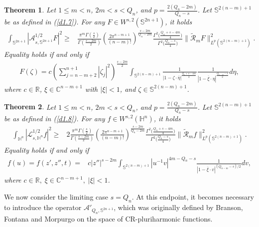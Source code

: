 \documentclass[12pt,reqno]{amsart}%
\newtheorem{theorem}{Theorem}[section]
\theoremstyle{plain}
\numberwithin{equation}{section}
\begin{document}
\begin{theorem}\label{th1.4}
Let \( 1 \leq m < n \), \( 2m < s < Q_n \), and \( p = \frac{2(Q_{n} - 2m)}{Q_{n} - s} \).
Let $\mathbb{S}^{2(n-m)+1}$ be as defined in  (\ref{d1.7}).
 For any \( F \in W^{s,2}(\mathbb{S}^{2n+1}) \), it holds
\begin{align*}
\int_{\mathbb{S}^{2n+1}}|\mathcal{A}_{s,\mathbb{S}^{2n+1}}^{1/2}F|^{2} \geq &
\frac{\pi^{m}\Gamma\left(\frac{s}{2}\right)}{\Gamma\left(\frac{s-2m}{2}\right)}
\left( \frac{2\pi^{n-m+1}}{(n-m)!} \right)^{\frac{s-2m}{Q_n-2m}}
\frac{\Gamma^{2}\bigl(\frac{Q_n + s - 4m}{4}\bigr)}{\Gamma^{2}\bigl(\frac{Q_n-s}{4}\bigr)}
\|\widetilde{\mathcal{R}}_m F\|_{L^{p}(\mathbb{S}^{2(n-m)+1})}^{2}.
\end{align*}
Equality holds if and only if
\begin{align*}
F(\zeta) = c\left(\sum_{j=n-m+2}^{n+1}|\zeta_{j}|^{2}\right)^{\frac{s-2m}{2}}\int_{\mathbb{S}^{2(n-m)+1}}
\frac{1}
{|1 - \zeta\cdot\overline{\eta}|^{\frac{Q_n + s - 4m}{2}}}
\frac{1}{|1 - \overline{\xi} \cdot \eta|^{\frac{Q_{n-m} - s}{2}}}  d\eta,
\end{align*}
where \( c \in \mathbb{R} \), \( \xi \in \mathbb{C}^{n-m+1} \) with \( |\xi| < 1 \), and \( \zeta \in \mathbb{S}^{2(n-m)+1} \).
\end{theorem}

\begin{theorem}\label{th1.5}
Let \( 1 \leq m < n \), \( 2m < s < Q_n \), and \( p = \frac{2(Q_{n} - 2m)}{Q_{n} - s} \). Let $\mathbb{S}^{2(n-m)+1}$ be  as defined in  (\ref{d1.8}). For any \( f \in W^{s,2}(\mathbb{H}^{n}) \), it holds
\begin{align*}
\int_{\mathbb{H}^{n}}|\mathcal{L}_{s,\mathbb{H}^{n}}^{1/2}f|^{2} \geq &2
\frac{\pi^{m}\Gamma\left(\frac{s}{2}\right)}{\Gamma\left(\frac{s-2m}{2}\right)}
\left( \frac{2\pi^{n-m+1}}{(n-m)!} \right)^{\frac{s-2m}{Q_n-2m}}
\frac{\Gamma^{2}\bigl(\frac{Q_n + s - 4m}{4}\bigr)}{\Gamma^{2}\bigl(\frac{Q_n-s}{4}\bigr)}
\|\widetilde{\mathcal{R}}_m f\|_{L^{p}(\mathbb{S}^{2(n-m)+1})}^{2}.
\end{align*}
Equality holds if and only if
\begin{align*}
f(u) = f(z',z'',t) = &  c|z''|^{s-2m}
\int_{\mathbb{S}^{2(n-m)+1}} |u^{-1}v|^{4m - Q_n - s}
\frac{1}{|1 - \overline{\xi} \cdot v|^{(Q_{n-m} - s)/2}}  dv,
\end{align*}
where $c \in \mathbb{R},\; \xi \in \mathbb{C}^{n-m+1},\; |\xi| < 1$.
\end{theorem}


We now consider the limiting case \( s = Q_n \). At this endpoint, it becomes necessary to introduce the operator \( \mathcal{A}'_{Q_n,\mathbb{S}^{2n+1}} \), which was originally defined by Branson, Fontana and Morpurgo \cite{br1} on the space of CR-pluriharmonic functions.
\end{document}
